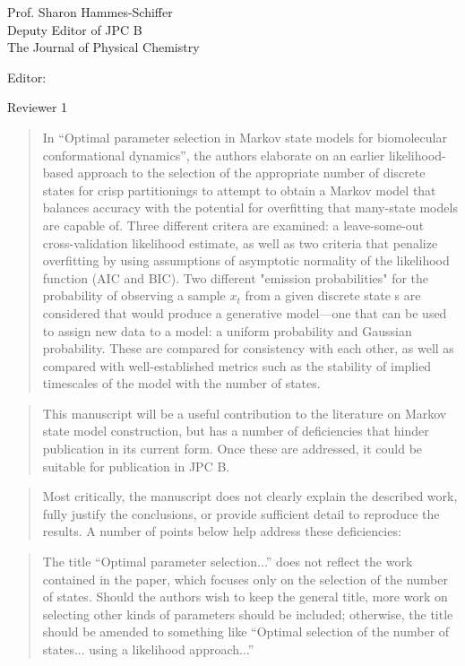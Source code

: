 \documentclass{letter}
\begin{document}
\begin{letter}{Prof. Sharon Hammes-Schiffer \\ Deputy Editor of JPC B \\ The Journal of Physical Chemistry}
\opening{Editor:}

Reviewer 1
\begin{quote}
In ``Optimal parameter selection in Markov state models for biomolecular conformational dynamics'', the authors elaborate on an earlier likelihood-based approach to the selection of the appropriate number of discrete states for crisp partitionings to attempt to obtain a Markov model that balances accuracy with the potential for overfitting that many-state models are capable of.  Three different critera are examined: a leave-some-out cross-validation likelihood estimate, as well as two criteria that penalize overfitting by using assumptions of asymptotic normality of the likelihood function (AIC and BIC).  Two different "emission probabilities" for the probability of observing a sample $x_t$ from a given discrete state s are considered that would produce a generative model---one that can be used to assign new data to a model: a uniform probability and Gaussian probability.  These are compared for consistency with each other, as well as compared with well-established metrics such as the stability of implied timescales of the model with the number of states.
\end{quote}

\begin{quote}
 This manuscript will be a useful contribution to the literature on Markov state model construction, but has a number of deficiencies that hinder publication in its current form.  Once these are addressed, it could be suitable for publication in JPC B.
\end{quote}

\begin{quote}
Most critically, the manuscript does not clearly explain the described work, fully justify the conclusions, or provide sufficient detail to reproduce the results.  A number of points below help address these deficiencies:
\end{quote}

\begin{quote}
The title ``Optimal parameter selection...'' does not reflect the work contained in the paper, which focuses only on the selection of the number of states.  Should the authors wish to keep the general title, more work on selecting other kinds of parameters should be included; otherwise, the title should be amended to something like ``Optimal selection of the number of states... using a likelihood approach...''
\end{quote}


\end{letter}
\end{document}
